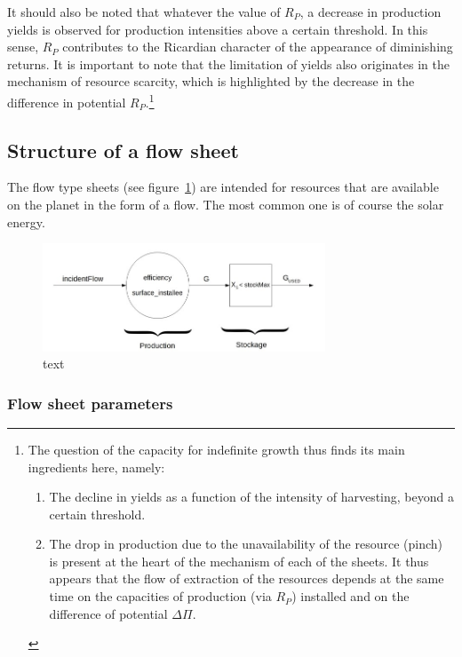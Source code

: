 \documentclass[12pt,a4paper]{article}%
\begin{document}
It should also be noted that whatever the value of $R_{P}$, a decrease in production yields is observed for production intensities above a certain threshold. In this sense, $R_{P}$ contributes to the Ricardian character of the appearance of diminishing returns.  It is important to note that the limitation of yields also originates in the mechanism of resource scarcity, which is highlighted by the decrease in the difference in potential $R_{P}$.\footnote{
	The question of the capacity for indefinite growth thus finds its main ingredients here, namely:
	\begin{enumerate}
		\item The decline in yields as a function of the intensity of harvesting, beyond a certain threshold.
		\item The drop in production due to the unavailability of the resource (pinch) is present at the heart of the mechanism of each of the sheets. It thus appears that the flow of extraction of the resources depends at the same time on the capacities of production (via $R_{P}$) installed and on the difference of potential $\Delta\Pi$.
	\end{enumerate}}

\subsection{Structure of a flow sheet}

The flow type sheets (see figure~\ref{fig:FlowSheet}) are intended for resources that are available on the planet in the form of a flow. The most common one is of course the solar energy.

\begin{figure}[h]
	\centering
	\includegraphics[width=0.75\textwidth]{figures/FeuilleFlux.jpg}
	\caption{text}
	\label{fig:FlowSheet}
\end{figure}

\subsubsection{Flow sheet parameters}
\end{document}
